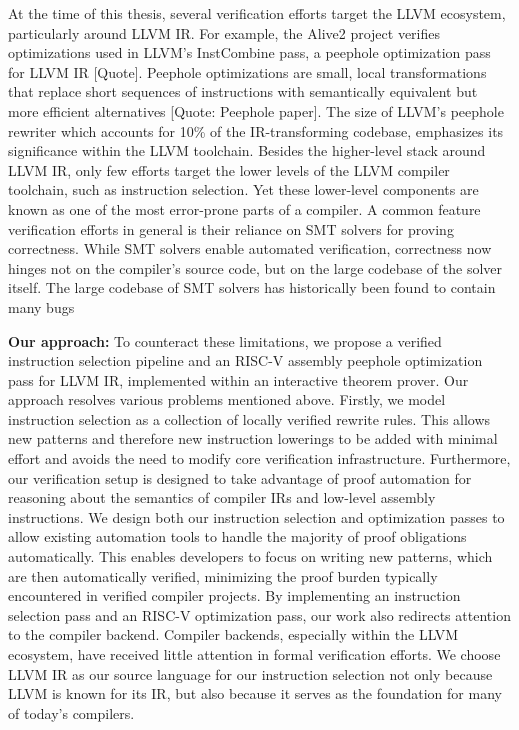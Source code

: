 At the time of this thesis, several verification efforts target the LLVM ecosystem, particularly around LLVM IR. For example, the Alive2 project verifies optimizations used in LLVM’s InstCombine pass, a peephole optimization pass for LLVM IR [Quote]. Peephole optimizations are small, local transformations that replace short sequences of instructions with semantically equivalent but more efficient alternatives [Quote: Peephole paper]. The size of LLVM's peephole rewriter which accounts  for  10\% of the IR-transforming codebase, emphasizes its significance within the LLVM toolchain. \cite{Bhat2024Verify}
Besides the higher-level stack around LLVM IR, only few efforts target the lower levels of the LLVM compiler toolchain, such as instruction selection. Yet these lower-level components are known as one of the most error-prone parts of a compiler. A common feature verification efforts in general is their reliance on SMT solvers for proving correctness. While SMT solvers enable automated verification, correctness now hinges not on the compiler’s source code, but on the large codebase of the solver itself. The large codebase of SMT solvers has historically been found to contain many bugs \cite{Nuno2021Alive2}

\textbf{Our approach:} To counteract these limitations, we propose a verified instruction selection pipeline and an RISC-V assembly peephole optimization pass for LLVM IR, implemented within an interactive theorem prover. Our approach resolves various problems mentioned above. Firstly, we model instruction selection as a collection of locally verified rewrite rules. This allows new patterns and therefore new instruction lowerings to be added with minimal effort and avoids the need to modify core verification infrastructure. Furthermore, our verification setup is designed to take advantage of proof automation for reasoning about the semantics of compiler IRs and low-level assembly instructions. We design both our instruction selection and optimization passes to allow existing automation tools to handle the majority of proof obligations automatically. This enables developers to focus on writing new patterns, which are then automatically verified, minimizing the proof burden typically encountered in verified compiler projects. By implementing an instruction selection pass and an RISC-V optimization pass, our work also redirects attention to the compiler backend. Compiler backends, especially within the LLVM ecosystem, have received little attention in formal verification efforts. We choose LLVM IR as our source language for our instruction selection not only because LLVM is known for its IR, but also because it serves as the foundation for many of today's compilers. 

